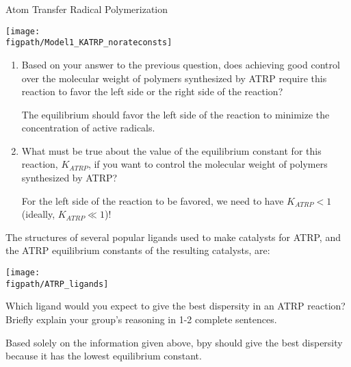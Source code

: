 \begin{activity}{Atom Transfer Radical Polymerization}
\begin{ctqs}
	\centerline{\texttt{[image: \\figpath/Model1\_KATRP\_norateconsts]}}
		
		\begin{enumerate}
			\item Based on your answer to the previous question, does achieving good control over the molecular weight of polymers synthesized by ATRP require this reaction to favor the left side or the right side of the reaction?
			
				\begin{solution}[0.9in]{}
				
					The equilibrium should favor the left side of the reaction to minimize the concentration of active radicals.
				
				\end{solution}
			
			\item What must be true about the value of the equilibrium constant for this reaction, $K_{ATRP}$, if you want to control the molecular weight of polymers synthesized by ATRP?
			
				\begin{solution}[0.9in]{}
				
					For the left side of the reaction to be favored,  we need to have $K_{ATRP}< 1$ (ideally, $K_{ATRP}\ll 1$)!
				
				\end{solution}
			
		\end{enumerate}

\end{ctqs}

\begin{infobox}
	The structures of several popular ligands used to make catalysts for ATRP, and the ATRP equilibrium constants of the resulting catalysts, are:
	
	\centerline{\texttt{[image: \\figpath/ATRP\_ligands]}}
\end{infobox}

\begin{ctqs}
	
	\question Which ligand would you expect to give the best dispersity in an ATRP reaction?  Briefly explain your group's reasoning in 1-2 complete sentences.
	
		\begin{solution}[1.25in]{}
		Based solely on the information given above, bpy should give the best dispersity because it has the lowest equilibrium constant.
		

\end{solution}
\end{ctqs}
\end{activity}
